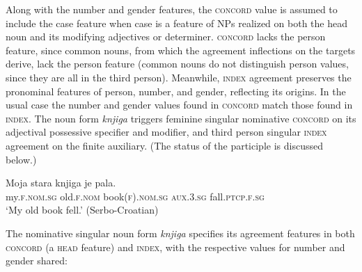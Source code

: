 \documentclass[output=paper
 	        ,biblatex
                ,babelshorthands
                ,newtxmath
                ,draftmode
                ,colorlinks, citecolor=brown
]{langscibook}
\begin{document}
Along with the number and gender features, the \textsc{concord} value is assumed to include the case
feature when case is a feature of NPs  realized on both the head noun and its modifying adjectives
or determiner.   \textsc{concord} lacks the person feature, since  common nouns, from which the
agreement inflections on the targets derive, lack the person feature (common nouns do not
distinguish person values, since they are all in the third person).    Meanwhile, \textsc{index}
agreement preserves the pronominal features of person, number, and gender, reflecting its origins.
In the usual case the number and gender values found in \textsc{concord} match those found in
\textsc{index}.  The  noun form \textit{knjiga} triggers feminine singular
nominative \textsc{concord} on its adjectival possessive specifier and modifier, and third person
singular \textsc{index} agreement on the finite auxiliary.  (The status of the participle is
discussed below.)

\begin{exe}
\ex  \label{fell}
\gll Moja 	           stara	      knjiga	           je                pala.\footnotemark  \\
     my.\textsc{f.nom.sg}  old.\textsc{f.nom} book(\textsc{f}).\textsc{nom.sg} \textsc{aux.3.sg} fall.\textsc{ptcp.f.sg} \\
\glt `My old book fell.' \hfill(Serbo-Croatian)
\end{exe}

\noindent
The nominative singular noun form \emph{knjiga} specifies its agreement features in both \textsc{concord} (a \textsc{head} feature) and \textsc{index}, with the respective values for number and gender shared:
\end{document}
